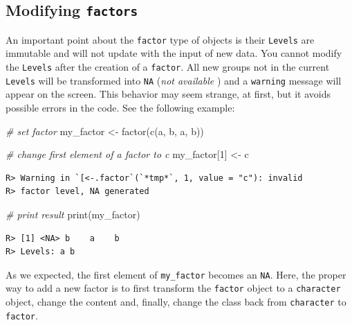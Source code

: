 \documentclass[
  12pt,
]{book}
\newenvironment{Shaded}{\begin{snugshade}}{\end{snugshade}}
\newcommand{\CommentTok}[1]{\textcolor[rgb]{0.37,0.37,0.37}{\textit{#1}}}
\newcommand{\DecValTok}[1]{\textcolor[rgb]{0.06,0.06,0.06}{#1}}
\newcommand{\FunctionTok}[1]{\textcolor[rgb]{0,0,0}{#1}}
\newcommand{\NormalTok}[1]{#1}
\newcommand{\OtherTok}[1]{\textcolor[rgb]{0.37,0.37,0.37}{#1}}
\newcommand{\StringTok}[1]{\textcolor[rgb]{0.5,0.5,0.5}{#1}}
\begin{document}
\hypertarget{modifying-factors}{%
\subsection{\texorpdfstring{Modifying \texttt{factors}}{Modifying factors}}\label{modifying-factors}}

An important point about the \texttt{factor} type of objects is their \texttt{Levels} are immutable and will not update with the input of new data. You cannot modify the \texttt{Levels} after the creation of a \texttt{factor}. All new groups not in the current \texttt{Levels} will be transformed into \texttt{NA} (\emph{not available} ) and a \texttt{warning} message will appear on the screen. This behavior may seem strange, at first, but it avoids possible errors in the code. See the following example:

\begin{Shaded}
\begin{Highlighting}[]
\CommentTok{\# set factor}
\NormalTok{my\_factor }\OtherTok{\textless{}{-}} \FunctionTok{factor}\NormalTok{(}\FunctionTok{c}\NormalTok{(}\StringTok{\textquotesingle{}a\textquotesingle{}}\NormalTok{, }\StringTok{\textquotesingle{}b\textquotesingle{}}\NormalTok{, }\StringTok{\textquotesingle{}a\textquotesingle{}}\NormalTok{, }\StringTok{\textquotesingle{}b\textquotesingle{}}\NormalTok{))}

\CommentTok{\# change first element of a factor to \textquotesingle{}c\textquotesingle{}}
\NormalTok{my\_factor[}\DecValTok{1}\NormalTok{] }\OtherTok{\textless{}{-}} \StringTok{\textquotesingle{}c\textquotesingle{}}
\end{Highlighting}
\end{Shaded}

\begin{verbatim}
R> Warning in `[<-.factor`(`*tmp*`, 1, value = "c"): invalid
R> factor level, NA generated
\end{verbatim}

\begin{Shaded}
\begin{Highlighting}[]
\CommentTok{\# print result}
\FunctionTok{print}\NormalTok{(my\_factor)}
\end{Highlighting}
\end{Shaded}

\begin{verbatim}
R> [1] <NA> b    a    b   
R> Levels: a b
\end{verbatim}

As we expected, the first element of \texttt{my\_factor} becomes an \texttt{NA}. Here, the proper way to add a new factor is to first transform the \texttt{factor} object to a \texttt{character} object, change the content and, finally, change the class back from \texttt{character} to \texttt{factor}. 
\end{document}
